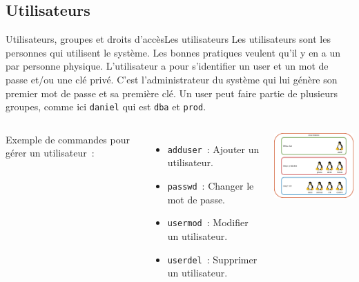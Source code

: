 \documentclass{beamer}
\begin{document}
    \subsection{Utilisateurs}\label{subsec:utilisateurs}
    \begin{frame}{Utilisateurs, groupes et droits d'accès}{Les utilisateurs}
        Les utilisateurs sont les personnes qui utilisent le système.
        Les bonnes pratiques veulent qu'il y en a un par personne physique.
        L'utilisateur a pour s'identifier un user et un mot de passe et/ou une clé privé.
        C'est l'administrateur du système qui lui génère son premier mot de passe et sa première clé.
        Un user peut faire partie de plusieurs groupes, comme ici \lstinline{daniel} qui est \lstinline{dba} et \lstinline{prod}.
        \begin{columns}
            Exemple de commandes pour gérer un utilisateur~:
            \begin{itemize}
                \item \lstinline{adduser}~: Ajouter un utilisateur.
                \item \lstinline{passwd}~: Changer le mot de passe.
                \item \lstinline{usermod}~: Modifier un utilisateur.
                \item \lstinline{userdel}~: Supprimer un utilisateur.
            \end{itemize}
            \centering
            \includegraphics[width=5cm]{image/groups-and-users.drawio}
        \end{columns}
    \end{frame}
\end{document}
